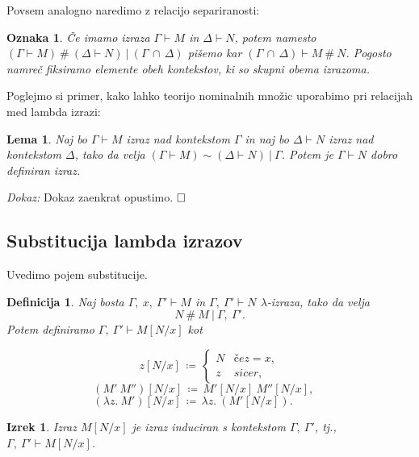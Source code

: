 \documentclass{article}
\def\qed{$\hfill\Box$}   %
\newtheorem{izrek}{Izrek}
\newtheorem{lema}{Lema}
\newtheorem{definicija}{Definicija}
\newtheorem{oznaka}{Oznaka}
\begin{document}
Povsem analogno naredimo z relacijo separiranosti:

\begin{oznaka}
    Če imamo izraza \(\Gamma \vdash M\) in \(\Delta \vdash N\), potem namesto \((\Gamma \vdash M) \ \#\ (\Delta \vdash N) \ \vert\ (\Gamma\, \cap\, \Delta)\) pišemo kar \((\Gamma\, \cap\, \Delta) \vdash M \ \#\ N\). Pogosto namreč fiksiramo elemente obeh kontekstov, ki so skupni obema izrazoma.
\end{oznaka}


Poglejmo si primer, kako lahko teorijo nominalnih množic uporabimo pri relacijah med lambda izrazi:

\begin{lema}
    Naj bo \(\Gamma \vdash M\) izraz nad kontekstom \(\Gamma\) in naj bo \(\Delta \vdash N\) izraz nad kontekstom \(\Delta\), tako da velja \((\Gamma \vdash M) \sim (\Delta \vdash N) \ \vert\ \Gamma\). Potem je \(\Gamma \vdash N\) dobro definiran izraz.
\end{lema}

\noindent
{\em Dokaz:\/}
Dokaz zaenkrat opustimo.
\qed

\subsection{Substitucija lambda izrazov}

Uvedimo pojem substitucije.

\begin{definicija}
    Naj bosta \(\Gamma,\ x,\ \Gamma' \vdash M\) in \(\Gamma,\ \Gamma' \vdash N\) \(\lambda\)-izraza, tako da velja \[N \ \#\  M \ \vert\  \Gamma,\ \Gamma'.\] Potem definiramo \(\Gamma,\ \Gamma' \vdash M[N/x]\) kot
    
    \[z[N/x]\, \coloneq\, \begin{cases*}
    N & če z = x,\\
    z & sicer,
    \end{cases*}
    \]
    \[
        (M'\ M'')[N/x]\, \coloneq\, M'[N/x]\ M''[N/x],\ \ \ \ \ 
    \]
    \[
        (\lambda z.\ M')[N/x]\, \coloneq\, \lambda z.\ (M'[N/x]).\quad \quad \quad
    \]
    
    
\end{definicija}

\begin{izrek}
    Izraz \(M[N/x]\) je izraz induciran s kontekstom \(\Gamma,\ \Gamma'\), tj., \(\Gamma,\ \Gamma' \vdash M[N/x]\).
\end{izrek}
\end{document}
